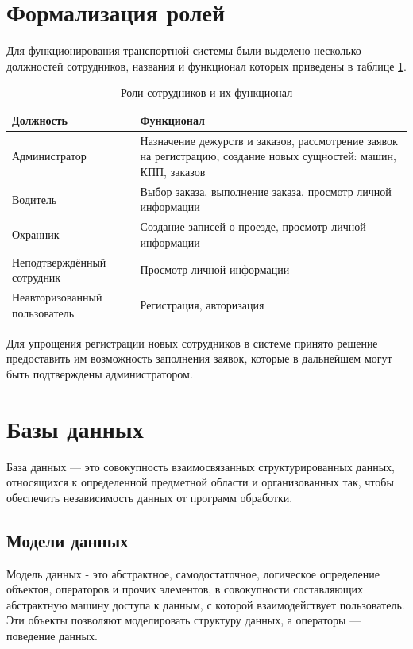 \section{Формализация ролей}
Для функционирования транспортной системы были выделено несколько должностей сотрудников, названия и функционал которых приведены в таблице \ref{role_table}.

\begin{table}[h] 
	\caption{Роли сотрудников и их функционал}
	\label{role_table}
	\begin{tabular}{| p{4.5cm} | p{9.7cm} |}
		\hline
		\textbf{Должность}		&	\textbf{Функционал} \\
		\hline
		Администратор			&	
		Назначение дежурств и заказов, рассмотрение заявок на регистрацию, создание новых сущностей: машин, КПП, заказов  \\
		\hline
		
		Водитель &
		Выбор заказа, выполнение заказа, просмотр личной информации \\
		\hline
		
		Охранник &
		Создание записей о проезде, просмотр личной информации  \\
		\hline
		
		Неподтверждённый сотрудник &
		Просмотр личной информации  \\	
		\hline	
		
		Неавторизованный пользователь &
		Регистрация, авторизация  \\		
		\hline
	\end{tabular}
\end{table}

Для упрощения регистрации новых сотрудников в системе принято решение предоставить им возможность заполнения заявок, которые в дальнейшем могут быть подтверждены администратором.

\section{Базы данных}
База данных — это совокупность взаимосвязанных структурированных данных, относящихся к определенной предметной области и организованных так, чтобы обеспечить независимость данных от программ обработки. \cite{db_model}

\subsection{Модели данных}
Модель данных - это абстрактное, самодостаточное, логическое определение объектов, операторов и прочих элементов, в совокупности составляющих абстрактную машину доступа к данным, с которой взаимодействует пользователь. Эти объекты позволяют моделировать
структуру данных, а операторы — поведение данных.
\cite{db_model2}

